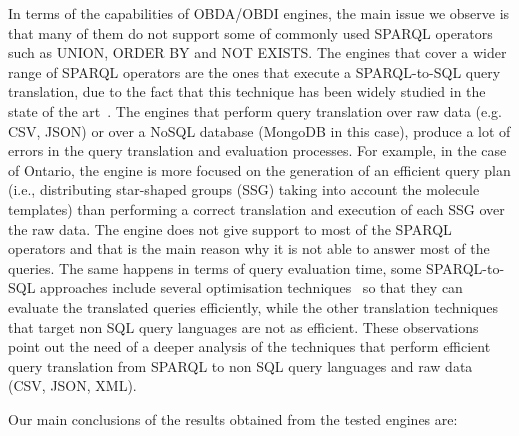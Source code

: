 In terms of the capabilities of OBDA/OBDI engines, the main issue we observe is that many of them do not support some of commonly used SPARQL operators such as UNION, ORDER BY and NOT EXISTS. The engines that cover a wider range of SPARQL operators are the ones that execute a SPARQL-to-SQL query translation, due to the fact that this technique has been widely studied in the state of the art~\citep{priyatna2014formalisation,calvanese2017ontop}. The engines that perform query translation over raw data (e.g. CSV, JSON) or over a NoSQL database (MongoDB in this case), produce a lot of errors in the query translation and evaluation processes. For example, in the case of Ontario, the engine is more focused on the generation of an efficient query plan (i.e., distributing star-shaped groups (SSG) taking into account the molecule templates) than performing a correct translation and execution of each SSG over the raw data. The engine does not give support to most of the SPARQL operators and that  is the main reason why it is not able to answer most of the queries. The same happens in terms of query evaluation time, some SPARQL-to-SQL approaches include several optimisation techniques~\citep{xiao2018efficient} so that they can evaluate the translated queries efficiently, while the other translation techniques that target non SQL query languages %
are not as efficient.
These observations point out the need of a deeper analysis of the techniques that perform efficient query translation from SPARQL to non SQL query languages and raw data (CSV, JSON, XML). 

Our main conclusions of the results obtained from the tested engines are: 

